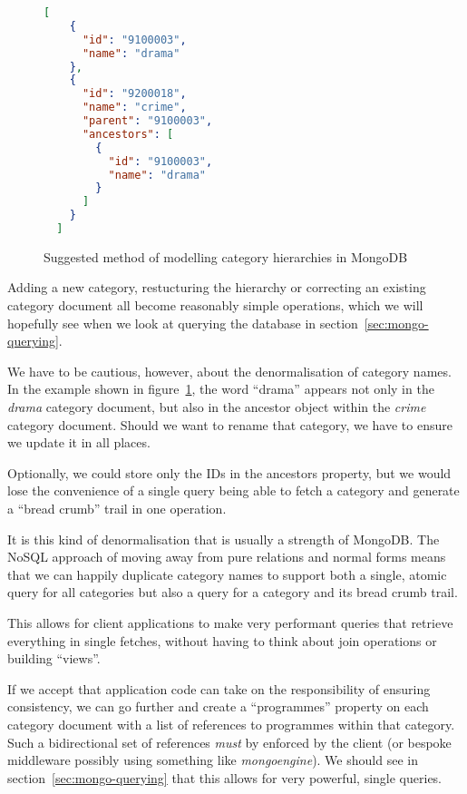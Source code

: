 \documentclass[11pt,a4paper]{article}
\begin{document}
\begin{figure}[p]
\begin{lstlisting}[language=json]
  [
    {
      "id": "9100003",
      "name": "drama"
    },
    {
      "id": "9200018",
      "name": "crime",
      "parent": "9100003",
      "ancestors": [
        {
          "id": "9100003",
          "name": "drama"
        }
      ]
    }
  ]
\end{lstlisting}
  \caption{Suggested method of modelling category hierarchies in MongoDB}
  \label{fig:json-categories}
\end{figure}

Adding a new category, restucturing the hierarchy or correcting an
existing category document all become reasonably simple operations, which
we will hopefully see when we look at querying the database in
section~\ref{sec:mongo-querying}.

We have to be cautious, however, about the denormalisation of category
names. In the example shown in figure~\ref{fig:json-categories}, the
word ``drama'' appears not only in the \emph{drama} category document, but
also in the ancestor object within the \emph{crime} category document.
Should we want to rename that category, we have to ensure we update it
in all places.

 Optionally, we could store only the IDs in the
ancestors property, but we would lose the convenience of a single
query being able to fetch a category and generate a ``bread crumb''
trail in one operation.

It is this kind of denormalisation that is usually a strength of MongoDB.
The NoSQL approach of moving away from pure relations and normal forms
means that we can happily duplicate category names to support
both a single, atomic query for all categories but also a query
for a category and its bread crumb trail.

This allows for client
applications to make very performant queries that retrieve everything
in single fetches, without having to think about join operations
or building ``views''.

If we accept that application code can take on the responsibility
of ensuring consistency, we can go further and create a
``programmes'' property on each category document with a list
of references to programmes within that category. Such a bidirectional
set of references \emph{must} by enforced by the client (or bespoke
middleware possibly using something like \emph{mongoengine}). We
should see in section~\ref{sec:mongo-querying} that this allows for
very powerful, single queries.
\end{document}
